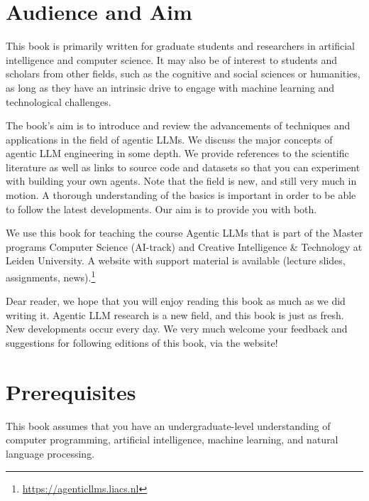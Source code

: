 \section{Audience and Aim}
This book is primarily written for graduate students and researchers in artificial intelligence and computer science. It may also be of interest to students and scholars from other fields, such as the cognitive and social sciences or humanities, as long as they have an intrinsic drive to engage with machine learning and technological challenges. 

The book's aim is to introduce and review the advancements of techniques and applications in the field of agentic LLMs. 
We discuss the major concepts of agentic LLM engineering in some depth. We provide references to the scientific literature as well as links to source code and datasets so that you can experiment with building your own agents. Note that the field is new, and still very much in motion. A thorough understanding of the basics is important in order to be able to follow the latest developments. Our aim is to provide you with both. 

We use this book for teaching the course Agentic LLMs that is part of  the Master programs Computer Science (AI-track) and Creative Intelligence \& Technology at Leiden University. A website with support material is available (lecture slides, assignments, news).\footnote{\url{https://agenticllms.liacs.nl}} 

Dear reader, we hope that you will enjoy reading this book as much as we did writing it. Agentic LLM research is a new field, and this book is just as fresh. New developments occur every day. We very much welcome your feedback and suggestions for following editions of this book, via the website! 

\section{Prerequisites}
This book assumes that you have an undergraduate-level understanding of computer programming, artificial intelligence, machine learning, and natural language processing.

